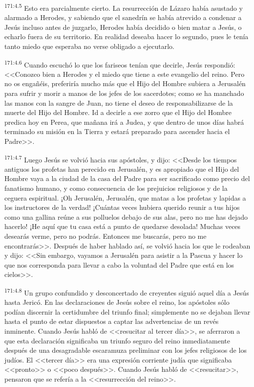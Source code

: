 \par 
\textsuperscript{171:4.5} Esto era parcialmente cierto. La resurrección de Lázaro había asustado y alarmado a Herodes, y sabiendo que el sanedrín se había atrevido a condenar a Jesús incluso antes de juzgarlo, Herodes había decidido o bien matar a Jesús, o echarlo fuera de su territorio. En realidad deseaba hacer lo segundo, pues le tenía tanto miedo que esperaba no verse obligado a ejecutarlo.

\par 
\textsuperscript{171:4.6} Cuando escuchó lo que los fariseos tenían que decirle, Jesús respondió: <<Conozco bien a Herodes y el miedo que tiene a este evangelio del reino. Pero no os engañéis, preferiría mucho más que el Hijo del Hombre subiera a Jerusalén para sufrir y morir a manos de los jefes de los sacerdotes; como se ha manchado las manos con la sangre de Juan, no tiene el deseo de responsabilizarse de la muerte del Hijo del Hombre. Id a decirle a ese zorro que el Hijo del Hombre predica hoy en Perea, que mañana irá a Judea, y que dentro de unos días habrá terminado su misión en la Tierra y estará preparado para ascender hacia el Padre>>.

\par 
\textsuperscript{171:4.7} Luego Jesús se volvió hacia sus apóstoles, y dijo: <<Desde los tiempos antiguos los profetas han perecido en Jerusalén, y es apropiado que el Hijo del Hombre vaya a la ciudad de la casa del Padre para ser sacrificado como precio del fanatismo humano, y como consecuencia de los prejuicios religiosos y de la ceguera espiritual. ¡Oh Jerusalén, Jerusalén, que matas a los profetas y lapidas a los instructores de la verdad! ¡Cuántas veces hubiera querido reunir a tus hijos como una gallina reúne a sus polluelos debajo de sus alas, pero no me has dejado hacerlo! ¡He aquí que tu casa está a punto de quedarse desolada! Muchas veces desearás verme, pero no podrás. Entonces me buscarás, pero no me encontrarás>>. Después de haber hablado así, se volvió hacia los que le rodeaban y dijo: <<Sin embargo, vayamos a Jerusalén para asistir a la Pascua y hacer lo que nos corresponda para llevar a cabo la voluntad del Padre que está en los cielos>>.

\par 
\textsuperscript{171:4.8} Un grupo confundido y desconcertado de creyentes siguió aquel día a Jesús hasta Jericó. En las declaraciones de Jesús sobre el reino, los apóstoles sólo podían discernir la certidumbre del triunfo final; simplemente no se dejaban llevar hasta el punto de estar dispuestos a captar las advertencias de un revés inminente. Cuando Jesús habló de <<resucitar al tercer día>>, se aferraron a que esta declaración significaba un triunfo seguro del reino inmediatamente después de una desagradable escaramuza preliminar con los jefes religiosos de los judíos. El <<tercer día>> era una expresión corriente judía que significaba <<pronto>> o <<poco después>>. Cuando Jesús habló de <<resucitar>>, pensaron que se refería a la <<resurrección del reino>>.

